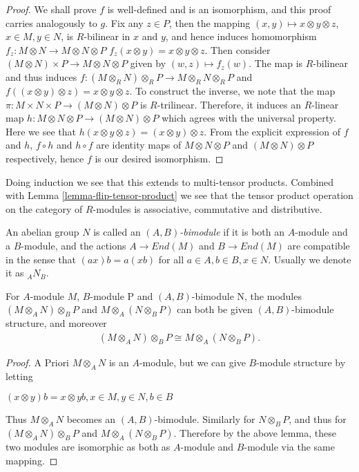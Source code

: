 \begin{proof}
We shall prove $f$ is well-defined and is an isomorphism, and this proof
carries analogously to $g$. Fix any
$z\in P$, then the mapping $(x, y)\mapsto x\otimes y\otimes z$,
$x\in M, y\in N$, is $R$-bilinear in $x$ and $y$,
and hence induces homomorphism $f_z : M\otimes N\rightarrow M\otimes N\otimes P$
$f_z(x\otimes y) = x\otimes y\otimes z$.
Then consider $(M\otimes N)\times P\rightarrow M\otimes N\otimes P$ given by
$(w, z)\mapsto f_z(w)$. The map is
$R$-bilinear and thus induces
$f : (M\otimes_R N)\otimes_R P\rightarrow M\otimes_R N\otimes_R P$
and $f((x\otimes y)\otimes z) = x\otimes y\otimes z$.
To construct the inverse, we note that the map
$\pi : M\times N\times P\rightarrow (M\otimes N)\otimes P$ is
$R$-trilinear.
Therefore, it induces an $R$-linear map
$h : M\otimes N\otimes P\rightarrow (M\otimes N)\otimes P$ which
agrees with the universal property. Here we see that
$h(x\otimes y\otimes z) = (x\otimes y)\otimes z$.
From the explicit expression of $f$ and $h$, $f\circ h$ and $h\circ f$ are
identity maps of $M\otimes N\otimes
P$ and $(M\otimes N)\otimes P$ respectively, hence $f$ is our desired
isomorphism.
\end{proof}

\noindent
Doing induction we see that this extends to multi-tensor products. Combined
with Lemma \ref{lemma-flip-tensor-product} we see that
the tensor product operation on the category of $R$-modules is associative,
commutative and distributive.

\begin{definition}
\label{definition-bimodule}
An abelian group $N$ is called an {\it $(A, B)$-bimodule} if it is both an
$A$-module and a $B$-module, and
the actions $A\rightarrow End(M)$ and $B\rightarrow End(M)$
are compatible in the sense that $(ax)b = a(xb)$ for all
$a\in A, b\in B, x\in N$. Usually we denote it as $_{A}N_{B}$.
\end{definition}

\begin{lemma}
\label{lemma-tensor-with-bimodule}
For $A$-module $M$, $B$-module P and $(A, B)$-bimodule N, the modules
$(M\otimes_{A}N)\otimes_{B}P$ and $M\otimes_{A}(N\otimes_{B}P)$ can both be
given $(A, B)$-bimodule structure,
and moreover
\begin{align}
(M\otimes_{A}N)\otimes_{B}P \cong M\otimes_{A}(N\otimes_{B}P).
\end{align}
\end{lemma}

\begin{proof}
A Priori $M\otimes_A N$ is an $A$-module, but we can give $B$-module structure
by letting
\begin{center}
$(x\otimes y)b = x\otimes yb, x\in M, y\in N, b\in B$
\end{center}
Thus $M\otimes_A N$ becomes an $(A, B)$-bimodule. Similarly for $N\otimes_B P$,
and thus for
$(M\otimes_{A}N)\otimes_{B}P$ and $M\otimes_{A}(N\otimes_{B}P)$. Therefore by
the above lemma, these two
modules are isomorphic as both as $A$-module and $B$-module via the same
mapping.
\end{proof}

